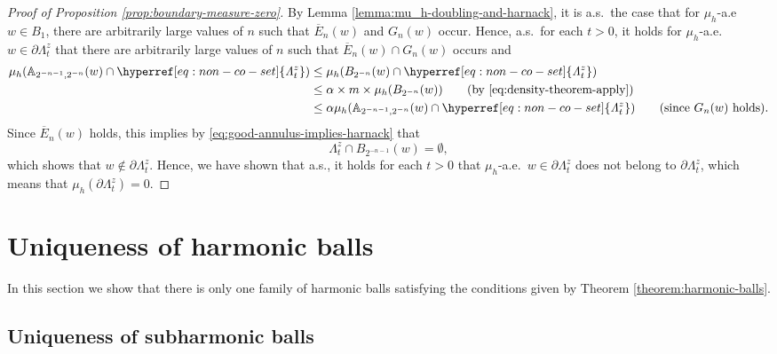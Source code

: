 \documentclass[12pt]{amsart}
\numberwithin{equation}{section}
\newcommand{\cluster}[2]{\hyperref[eq:non-co-set]{\mathit{\Lambda}^{#1}_{#2}}}
\begin{document}
\begin{proof}[Proof of Proposition \ref{prop:boundary-measure-zero}]
		By Lemma \ref{lemma:mu_h-doubling-and-harnack}, it is a.s.\ the case that for $\mu_h$-a.e\ $w\in B_1$, there are arbitrarily large values of $n$ such that $\overline E_{n}(w)$ and $G_{n}(w)$ occur. 
		Hence, a.s.\ for each $t>0$, it holds for $\mu_h$-a.e.\ $w\in\partial {\cluster{z}{t}}$ that there are arbitrarily large values of $n$ such that $\overline E_n(w) \cap G_n(w)$ occurs and
		\begin{align*}
		\mu_h(\A_{2^{-n-1}, 2^{-n}}(w) \cap {\cluster{z}{t}}) &\leq \mu_h(B_{2^{-n}}(w) \cap {\cluster{z}{t}})   \\
		&\leq \alpha \times m \times \mu_h(B_{2^{-n}}(w)) \qquad \mbox{(by \eqref{eq:density-theorem-apply})} \\
		&\leq \alpha \mu_h(\A_{2^{-n-1}, 2^{-n}}(w) \cap {\cluster{z}{t}}) \qquad \mbox{(since $G_n(w)$ holds)}. 
		\end{align*}
		Since $\overline E_{n}(w)$ holds, this implies by \eqref{eq:good-annulus-implies-harnack} that
		\[
		{\cluster{z}{t}} \cap B_{2^{-n-1}}(w) = \emptyset, 
		\]
		which shows that $w\notin \partial {\cluster{z}{t}}$. Hence, we have shown that a.s., it holds for each $t>0$ that $\mu_h$-a.e.\ $w\in \partial {\cluster{z}{t}}$ does not belong to $\partial{\cluster{z}{t}}$, which means that $\mu_h(\partial{\cluster{z}{t}}) = 0$.  
	\end{proof}
	
	
	
	
	
	
	
	
	\section{Uniqueness of harmonic balls} \label{sec:uniqueness}
	
	In this section we show that there is only one family of harmonic balls satisfying the conditions given by Theorem \ref{theorem:harmonic-balls}. 
	
	\subsection{Uniqueness of subharmonic balls}
	
\end{document}
